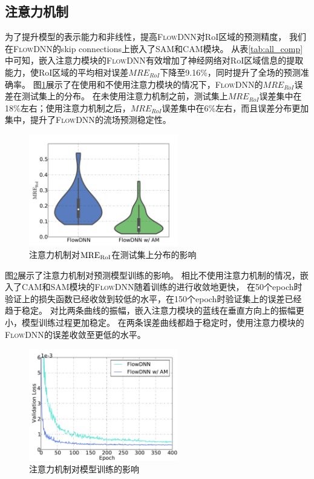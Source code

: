 \subsection{注意力机制}
为了提升模型的表示能力和非线性，提高\textsc{FlowDNN}对RoI区域的预测精度，
我们在\textsc{FlowDNN}的skip connections上嵌入了SAM和CAM模块。
从表\ref{tab:all_comp}中可知，嵌入注意力模块的\textsc{FlowDNN}有效增加了神经网络对RoI区域信息的提取能力，使RoI区域的平均相对误差$MRE_{RoI}$下降至9.16\%，同时提升了全场的预测准确率。
图\ref{fig:attention_violin}展示了在使用和不使用注意力模块的情况下，\textsc{FlowDNN}的$MRE_{RoI}$误差在测试集上的分布。
在未使用注意力机制之前，测试集上$MRE_{RoI}$误差集中在18\%左右；使用注意力机制之后，$MRE_{RoI}$误差集中在6\%左右，而且误差分布更加集中，提升了\textsc{FlowDNN}的流场预测稳定性。

\begin{figure}[htp]
	\centering
	\includegraphics[width=0.58\textwidth]{./figures/data/data_pre/error_s_compare_violin.pdf}
	
	\caption{注意力机制对$\rm{MRE_{RoI}}$在测试集上分布的影响}
	\label{fig:attention_violin}
\end{figure}

图\ref{fig:attention_val_loss_comp}展示了注意力机制对预测模型训练的影响。
相比不使用注意力机制的情况，嵌入了CAM和SAM模块的\textsc{FlowDNN}随着训练的进行收敛地更快，
在50个epoch时验证上的损失函数已经收敛到较低的水平，在150个epoch时验证集上的误差已经趋于稳定。
对比两条曲线的振幅，嵌入注意力模块的蓝线在垂直方向上的振幅更小，模型训练过程更加稳定。
在两条误差曲线都趋于稳定时，使用注意力模块的\textsc{FlowDNN}的误差收敛至更低的水平。

\begin{figure}[htp]
	\centering
	\includegraphics[width=0.58\textwidth]{./figures/data/am_comp.pdf}
	\caption{注意力机制对模型训练的影响}
	\label{fig:attention_val_loss_comp}
\end{figure}

